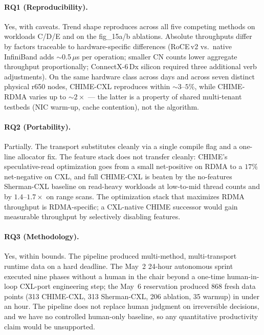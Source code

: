 \documentclass[11pt,a4paper]{article}
\begin{document}
\paragraph{RQ1 (Reproducibility).} Yes, with caveats. Trend shape reproduces across all five competing methods on workloads C/D/E and on the fig\_15a/b ablations. Absolute throughputs differ by factors traceable to hardware-specific differences (RoCE\,v2 vs.\ native InfiniBand adds $\sim$0.5\,$\mu$s per operation; smaller CN counts lower aggregate throughput proportionally; ConnectX-6\,Dx silicon required three additional verb adjustments). On the same hardware class across days and across seven distinct physical r650 nodes, CHIME-CXL reproduces within $\sim 3$--$5\%$, while CHIME-RDMA varies up to $\sim 2\times$ --- the latter is a property of shared multi-tenant testbeds (NIC warm-up, cache contention), not the algorithm.

\paragraph{RQ2 (Portability).} Partially. The transport substitutes cleanly via a single compile flag and a one-line allocator fix. The feature stack does not transfer cleanly: CHIME's speculative-read optimization goes from a small net-positive on RDMA to a $17\%$ net-negative on CXL, and full CHIME-CXL is beaten by the no-features Sherman-CXL baseline on read-heavy workloads at low-to-mid thread counts and by $1.4$--$1.7\times$ on range scans. The optimization stack that maximizes RDMA throughput is RDMA-specific; a CXL-native CHIME successor would gain measurable throughput by selectively disabling features.

\paragraph{RQ3 (Methodology).} Yes, within bounds. The pipeline produced multi-method, multi-transport runtime data on a hard deadline. The May~2 24-hour autonomous sprint executed nine phases without a human in the chair beyond a one-time human-in-loop CXL-port engineering step; the May~6 reservation produced 868 fresh data points (313 CHIME-CXL, 313 Sherman-CXL, 206 ablation, 35 warmup) in under an hour. The pipeline does not replace human judgment on irreversible decisions, and we have no controlled human-only baseline, so any quantitative productivity claim would be unsupported.
\end{document}
